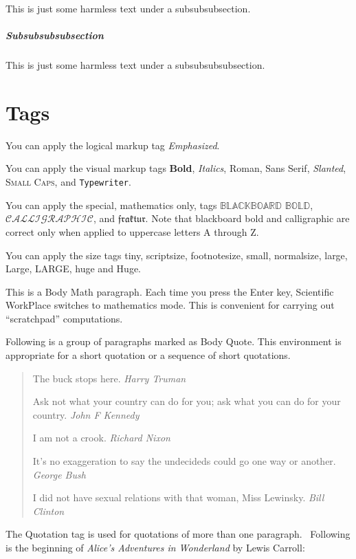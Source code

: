 \documentclass[11pt,spanish]{report}
\begin{document}
This is just some harmless text under a subsubsubsection.

\subparagraph{Subsubsubsubsection}

This is just some harmless text under a subsubsubsubsection.

\section{Tags}

You can apply the logical markup tag \emph{Emphasized}.

You can apply the visual markup tags \textbf{Bold}, \textit{Italics},
\textrm{Roman}, \textsf{Sans Serif}, \textsl{Slanted}, \textsc{Small Caps},
and \texttt{Typewriter}.

You can apply the special, mathematics only, tags $\mathbb{BLACKBOARD}$
$\mathbb{BOLD}$, $\mathcal{CALLIGRAPHIC}$, and $\mathfrak{fraktur}$. Note that
blackboard bold and calligraphic are correct only when applied to uppercase
letters A through Z.

You can apply the size tags {\tiny tiny}, {\scriptsize scriptsize},
{\footnotesize footnotesize}, {\small small}, {\normalsize normalsize},
{\large large}, {\Large Large}, {\LARGE LARGE}, {\huge huge} and {\Huge Huge}.

This is a Body Math paragraph. Each time you press the Enter key, Scientific
WorkPlace switches to mathematics mode. This is convenient for carrying out
``scratchpad'' computations.

Following is a group of paragraphs marked as Body Quote. This environment is
appropriate for a short quotation or a sequence of short quotations.

\begin{quote}
The buck stops here. \emph{Harry Truman}

Ask not what your country can do for you; ask what you can do for your
country. \emph{John F Kennedy}

I am not a crook. \emph{Richard Nixon}

It's no exaggeration to say the undecideds could go one way or another.
\emph{George Bush}

I did not have sexual relations with that woman, Miss Lewinsky. \emph{Bill Clinton}
\end{quote}

The Quotation tag is used for quotations of more than one paragraph.
\ Following is the beginning of \emph{Alice's Adventures in Wonderland }by
Lewis Carroll:
\end{document}
